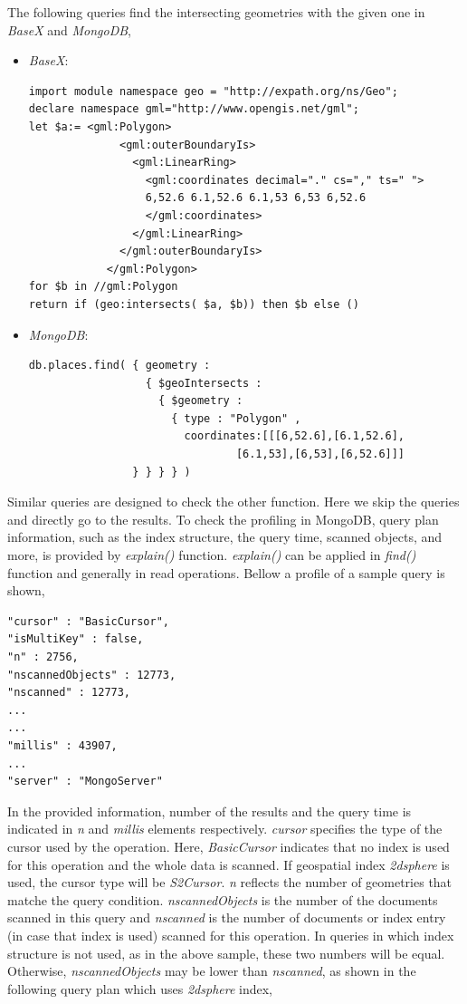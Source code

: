 \documentclass[a4paper,12pt]{article}
\begin{document}
The following queries find the intersecting geometries with the given one in \textit{BaseX} and \textit{MongoDB},
\begin{itemize}
\item \textit{BaseX}:
\begin{verbatim}
import module namespace geo = "http://expath.org/ns/Geo";
declare namespace gml="http://www.opengis.net/gml";
let $a:= <gml:Polygon>
              <gml:outerBoundaryIs>
                <gml:LinearRing>
                  <gml:coordinates decimal="." cs="," ts=" ">
                  6,52.6 6.1,52.6 6.1,53 6,53 6,52.6
                  </gml:coordinates>
                </gml:LinearRing>
              </gml:outerBoundaryIs>
            </gml:Polygon>
for $b in //gml:Polygon 
return if (geo:intersects( $a, $b)) then $b else ()
\end{verbatim}
\item \textit{MongoDB}: 
\begin{verbatim}
db.places.find( { geometry :
                  { $geoIntersects :
                    { $geometry :
                      { type : "Polygon" ,
                        coordinates:[[[6,52.6],[6.1,52.6],
                        	    [6.1,53],[6,53],[6,52.6]]]
                } } } } )
\end{verbatim}
\end{itemize}
Similar queries are designed to check the other function. Here we skip the queries and directly go to the results. To check the profiling in MongoDB, query plan information, such as the index structure, the query time, scanned objects, and more, is provided by \textit{explain()} function. \textit{explain()} can be applied in \textit{find()} function and generally in read operations. Bellow a profile of a sample query is shown,

\begin{verbatim}
"cursor" : "BasicCursor",
"isMultiKey" : false,
"n" : 2756,
"nscannedObjects" : 12773,
"nscanned" : 12773,
...
...
"millis" : 43907,
...
"server" : "MongoServer"
\end{verbatim}

In the provided information, number of the results and the query time is indicated in \textit{n} and \textit{millis} elements respectively. \textit{cursor} specifies the type of the cursor used by the operation. Here, \textit{BasicCursor} indicates that no index is used for this operation and the whole data is scanned. If geospatial index \textit{2dsphere} is used, the cursor type will be \textit{S2Cursor}. \textit{n} reflects the number of geometries that matche the query condition. \textit{nscannedObjects} is the number of the documents scanned in this query and \textit{nscanned} is the number of documents or index entry (in case that index is used) scanned for this operation. In queries in which index structure is not used, as in the above sample, these two numbers will be equal. Otherwise, \textit{nscannedObjects} may be lower than \textit{nscanned}, as shown in the following query plan which uses \textit{2dsphere} index, 
\end{document}
